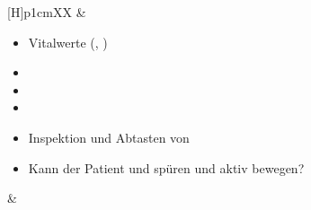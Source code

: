 \documentclass[
ngerman,
paper=a4,
asymmetric,
fontsize=9pt,
draft=false,
openany,
numbers=noenddot,
bibtotocnumbered,
footnotes=multiple,
toc=flat,
]{scrbook}
\begin{document}
{\begin{minipage}[t]{\linewidth -
{2\fboxrule} - {2\fboxsep}}
\begin{minipage}[t]{\linewidth}
{\begin{tabularx}{\linewidth}[H]{p{1cm}XX}
&
\begin{minipage}[t]{\linewidth}
\begin{itemize}
  \item Vitalwerte (, )
  \item {}
  \item {}
  \item {}
  \item[*] Inspektion
  und Abtasten von
  \item[*] Kann der
  Patient  und  spüren und aktiv bewegen?
\end{itemize}
\end{minipage}
&
\\\addlinespace\midrule\addlinespace
\noindent{}


\end{tabularx}}
\end{minipage}
\end{minipage}}
\end{document}
